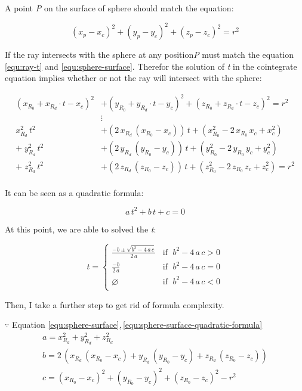 A point \emph{P} on the surface of sphere should match the equation:

\begin{equation}
\label{equ:sphere-surface}
(x_p - x_c)^2 + (y_p - y_c)^2 + (z_p - z_c)^2 = r^2
\end{equation}

If the ray intersects with the sphere at any position\;\emph{P} must match the equation \ref{equ:ray-t} and \ref{equ:sphere-surface}. Therefor the solution of \emph{t} in the cointegrate equation implies whether or not the ray will intersect with the sphere:

\[
\begin{aligned}
(x_{R_0} + x_{R_d} \cdot t - x_c)^2 &+ (y_{R_0} + y_{R_d} \cdot t - y_c)^2 + (z_{R_0} + z_{R_d} \cdot t - z_c)^2 = r^2\\
&\vdots\\
x_{R_d}^2\,t^2 &+ (2\,x_{R_d}\,(x_{R_0} - x_c))\,t + (x_{R_0}^2 - 2\,x_{R_0}\,x_c + x_c^2)\\
+\;y_{R_d}^2\,t^2 &+ (2\,y_{R_d}\,(y_{R_0} - y_c))\,t + (y_{R_0}^2 - 2\,y_{R_0}\,y_c + y_c^2)\\
+\;z_{R_d}^2\,t^2 &+ (2\,z_{R_d}\,(z_{R_0} - z_c))\,t + (z_{R_0}^2 - 2\,z_{R_0}\,z_c + z_c^2) = r^2\\
\end{aligned}
\]

It can be seen as a quadratic formula:

\begin{equation}
\label{equ:sphere-surface-quadratic-formula}
a\,t^2 + b\,t + c = 0
\end{equation}

At this point, we are able to solved the \emph{t}:

\[
t =
\begin{cases}
\frac{-b \pm \sqrt{b^2 - 4\,a\,c}}{2\,a} & \text{if }\;b^2 - 4\,a\,c > 0\\
\frac{-b}{2\,a} & \text{if }\; b^2 - 4\,a\,c = 0\\
\varnothing & \text{if }\; b^2 - 4\,a\,c < 0\\
\end{cases}
\]

Then, I take a further step to get rid of formula complexity.

$\because$ Equation \ref{equ:sphere-surface},\,\ref{equ:sphere-surface-quadratic-formula}
\[
\begin{array}{lr}
a = x_{R_d}^2 + y_{R_d}^2 + z_{R_d}^2\\
b = 2\,(x_{R_d}\,(x_{R_0} - x_c) + y_{R_d}\,(y_{R_0} - y_c) + z_{R_d}\,(z_{R_0} - z_c))\\
c = (x_{R_0} - x_c)^2 + (y_{R_0} - y_c)^2 + (z_{R_0} - z_c)^2 - r^2\\
\end{array}
\]

